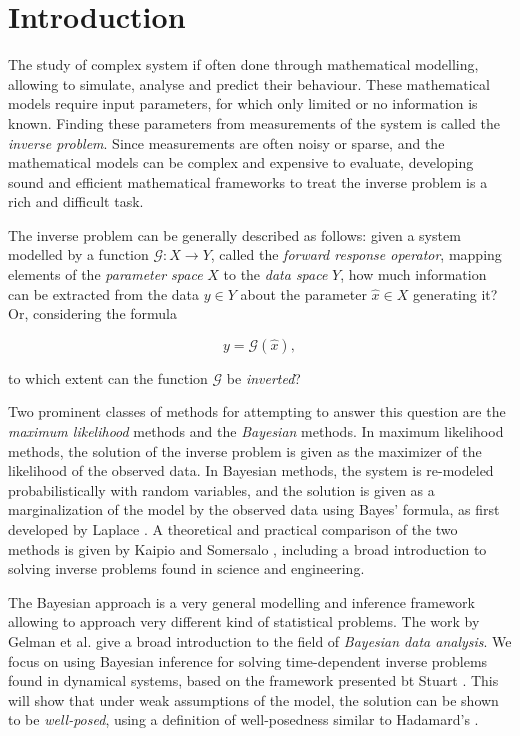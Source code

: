\section{Introduction}
\setcounter{page}{1}
\thispagestyle{empty}

The study of complex system if often done through mathematical modelling, allowing to simulate, analyse and predict their behaviour. These mathematical models require input parameters, for which only limited or no information is known. Finding these parameters from measurements of the system is called the \textit{inverse problem}. Since measurements are often noisy or sparse, and the mathematical models can be complex and expensive to evaluate, developing sound and efficient mathematical frameworks to treat the inverse problem is a rich and difficult task.

The inverse problem can be generally described as follows: given a system modelled by a function $\mathcal{G} : X \rightarrow Y$, called the \textit{forward response operator}, mapping elements of the \textit{parameter space} $X$ to the \textit{data space} $Y$, how much information can be extracted from the data $y \in Y$ about the parameter $\hat{x} \in X$ generating it? Or, considering the formula

\begin{equation*}
  y = \mathcal{G}(\hat{x}),
\end{equation*}

to which extent can the function $\mathcal{G}$ be \textit{inverted}?

Two prominent classes of methods for attempting to answer this question are the \textit{maximum likelihood} methods and the \textit{Bayesian} methods. In maximum likelihood methods, the solution of the inverse problem is given as the maximizer of the likelihood of the observed data. In Bayesian methods, the system is re-modeled probabilistically with random variables, and the solution is given as a marginalization of the model by the observed data using Bayes' formula, as first developed by Laplace \cite{laplace1820theorie}. A theoretical and practical comparison of the two methods is given by Kaipio and Somersalo \cite{kaipio2006statistical}, including a broad introduction to solving inverse problems found in science and engineering. 

The Bayesian approach is a very general modelling and inference framework allowing to approach very different kind of statistical problems. The work by Gelman et al. \cite{gelman} give a broad introduction to the field of \textit{Bayesian data analysis}. We focus on using Bayesian inference for solving time-dependent inverse problems found in dynamical systems, based on the framework presented bt Stuart \cite{stuart_2010}. This will show that under weak assumptions of the model, the solution can be shown to be \textit{well-posed}, using a definition of well-posedness similar to Hadamard's \cite{hadamard}.

